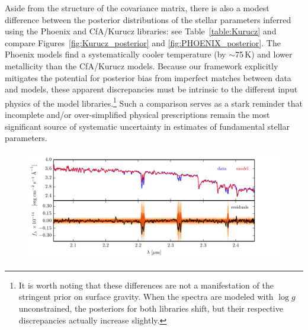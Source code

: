 \documentclass[iop,floatfix,numberedappendix,twocolappendix]{emulateapj}
\begin{document}
Aside from the structure of the covariance matrix, there is also a modest difference between the 
posterior distributions of the stellar parameters inferred using the {\sc Phoenix} and {\sc 
CfA/Kurucz} libraries: see Table~\ref{table:Kurucz} and compare Figures~\ref{fig:Kurucz_posterior} 
and \ref{fig:PHOENIX_posterior}.  The {\sc Phoenix} models find a systematically cooler temperature 
(by $\sim$75\,K) and lower metallicity than the {\sc CfA/Kurucz} models.  Because our framework 
explicitly mitigates the potential for posterior bias from imperfect matches between data and 
models, these apparent discrepancies must be intrinsic to the different input physics of the model 
libraries.\footnote{It is worth noting that these differences are not a manifestation of the 
stringent prior on surface gravity.  When the spectra are modeled with $\log g$ unconstrained, the 
posteriors for both libraries shift, but their respective discrepancies actually increase 
slightly.}  Such a comparison serves as a stark reminder that incomplete and/or over-simplified 
physical prescriptions remain the most significant source of systematic uncertainty in estimates of 
fundamental stellar parameters.

\begin{figure}[!htb]
  \includegraphics{residuals_Gl51_logg.pdf}
\vspace{-0.3cm}
\vspace{0.2cm}
\end{figure}
\end{document}
